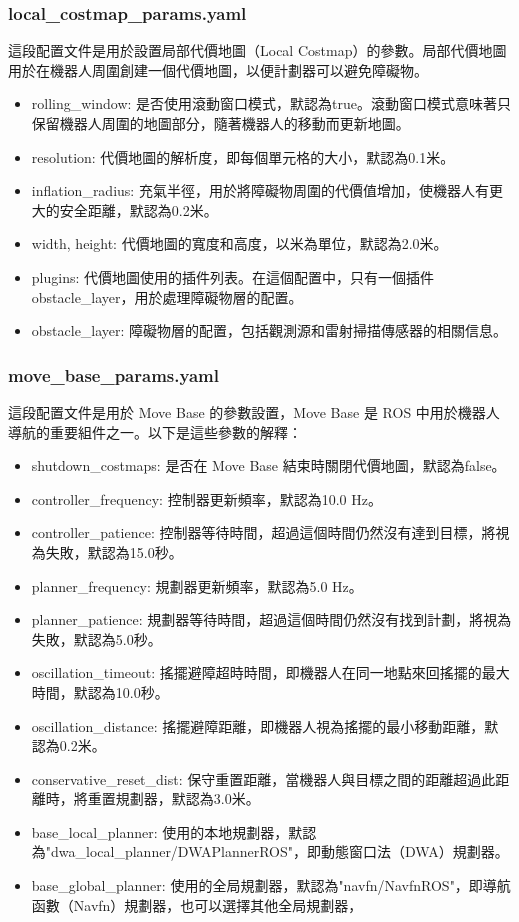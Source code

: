 \subsubsection{local\_costmap\_params.yaml}
這段配置文件是用於設置局部代價地圖（Local Costmap）的參數。局部代價地圖用於在機器人周圍創建一個代價地圖，以便計劃器可以避免障礙物。

\begin{itemize}
    \item rolling\_window: 是否使用滾動窗口模式，默認為true。滾動窗口模式意味著只保留機器人周圍的地圖部分，隨著機器人的移動而更新地圖。
    \item resolution: 代價地圖的解析度，即每個單元格的大小，默認為0.1米。
    \item inflation\_radius: 充氣半徑，用於將障礙物周圍的代價值增加，使機器人有更大的安全距離，默認為0.2米。
    \item width, height: 代價地圖的寬度和高度，以米為單位，默認為2.0米。
    \item plugins: 代價地圖使用的插件列表。在這個配置中，只有一個插件 obstacle\_layer，用於處理障礙物層的配置。
    \item obstacle\_layer: 障礙物層的配置，包括觀測源和雷射掃描傳感器的相關信息。
\end{itemize}

\subsubsection{move\_base\_params.yaml}

這段配置文件是用於 Move Base 的參數設置，Move Base 是 ROS 中用於機器人導航的重要組件之一。以下是這些參數的解釋：

\begin{itemize}
    \item shutdown\_costmaps: 是否在 Move Base 結束時關閉代價地圖，默認為false。
    \item controller\_frequency: 控制器更新頻率，默認為10.0 Hz。
    \item controller\_patience: 控制器等待時間，超過這個時間仍然沒有達到目標，將視為失敗，默認為15.0秒。
    \item planner\_frequency: 規劃器更新頻率，默認為5.0 Hz。
    \item planner\_patience: 規劃器等待時間，超過這個時間仍然沒有找到計劃，將視為失敗，默認為5.0秒。
    \item oscillation\_timeout: 搖擺避障超時時間，即機器人在同一地點來回搖擺的最大時間，默認為10.0秒。
    \item oscillation\_distance: 搖擺避障距離，即機器人視為搖擺的最小移動距離，默認為0.2米。
    \item conservative\_reset\_dist: 保守重置距離，當機器人與目標之間的距離超過此距離時，將重置規劃器，默認為3.0米。
    \item base\_local\_planner: 使用的本地規劃器，默認為"dwa\_local\_planner/DWAPlannerROS"，即動態窗口法（DWA）規劃器。
    \item base\_global\_planner: 使用的全局規劃器，默認為"navfn/NavfnROS"，即導航函數（Navfn）規劃器，也可以選擇其他全局規劃器，
\end{itemize}

